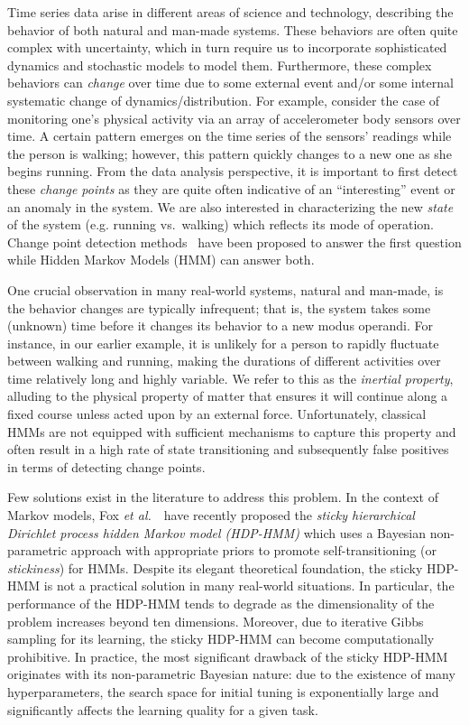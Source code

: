 \documentclass[letterpaper]{article}
\begin{document}
Time series data arise in different areas of science and technology, describing
the behavior of both natural and man-made systems. These
behaviors are often quite complex with uncertainty, which in turn require us to
incorporate sophisticated dynamics and stochastic models to model them.
Furthermore, these complex behaviors can \emph{change} over time due to some external event and/or some internal
systematic change of dynamics/distribution. For example, consider the case of
monitoring one's physical activity via an array of accelerometer body sensors
over time. A certain pattern emerges on the time series of the sensors' readings
while the person is walking; however, this pattern quickly changes to a new one
as she begins running. From the data analysis perspective, it is
important to first detect these \emph{change points} as they are quite often
indicative of an ``interesting'' event or an anomaly in the system. We
are also interested in characterizing the new \emph{state} of the system (e.g. running vs.\
walking) which reflects its mode of operation. Change point detection
methods~\cite{kawahara2007change,xie2013change,liu2013change,ray2002bayesian}
have been proposed to answer the first question while Hidden Markov Models (HMM) can answer both.

One crucial observation in many real-world systems, natural and man-made, is the behavior changes are typically infrequent; that is, the
system takes some (unknown) time before it changes its behavior to a new modus operandi. For
instance, in our earlier example, it is unlikely for a person to rapidly fluctuate between
walking and running, making the durations of different
activities over time relatively long and highly variable. We refer to this as the
\emph{inertial property}, alluding to the physical property of matter that
ensures it will continue along a fixed course unless acted upon by an external
force. Unfortunately, classical HMMs are not equipped with sufficient
mechanisms to capture this property and often result in a high rate of
state transitioning and subsequently false positives in terms of detecting
change points.

Few solutions exist in the literature to address this problem. In
the context of Markov models, Fox \emph{et al.}~\cite{fox2011sticky,willsky2009nonparametric}\ have
recently proposed the \emph{sticky hierarchical Dirichlet process hidden Markov
model (HDP-HMM)} which uses a Bayesian non-parametric approach with appropriate
priors to promote self-transitioning (or \emph{stickiness}) for HMMs. Despite its
elegant theoretical foundation, the sticky HDP-HMM is not a practical solution in many real-world situations.
In particular, the performance of the HDP-HMM tends to degrade as the
dimensionality of the problem increases beyond ten dimensions. Moreover, due to 
iterative Gibbs sampling for its learning, the sticky HDP-HMM can become computationally prohibitive. 
In practice, the most significant drawback of the sticky HDP-HMM originates with its non-parametric 
Bayesian nature: due to the existence of many hyperparameters, the search space for initial tuning is 
exponentially large and significantly affects the learning quality for a given task.
\end{document}
